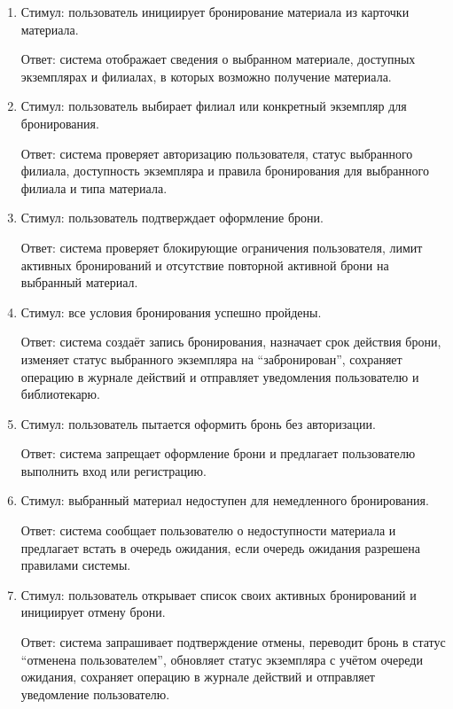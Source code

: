 \documentclass[12pt,a4paper]{article}
\begin{document}
	\begin{enumerate}
		\item Стимул: пользователь инициирует бронирование материала из карточки
		материала.
		
		Ответ: система отображает сведения о выбранном материале, доступных
		экземплярах и филиалах, в которых возможно получение материала.
		
		\item Стимул: пользователь выбирает филиал или конкретный экземпляр для
		бронирования.
		
		Ответ: система проверяет авторизацию пользователя, статус выбранного филиала,
		доступность экземпляра и правила бронирования для выбранного филиала и типа
		материала.
		
		\item Стимул: пользователь подтверждает оформление брони.
		
		Ответ: система проверяет блокирующие ограничения пользователя, лимит активных
		бронирований и отсутствие повторной активной брони на выбранный материал.
		
		\item Стимул: все условия бронирования успешно пройдены.
		
		Ответ: система создаёт запись бронирования, назначает срок действия брони,
		изменяет статус выбранного экземпляра на ``забронирован'', сохраняет операцию
		в журнале действий и отправляет уведомления пользователю и библиотекарю.
		
		\item Стимул: пользователь пытается оформить бронь без авторизации.
		
		Ответ: система запрещает оформление брони и предлагает пользователю выполнить
		вход или регистрацию.
		
		\item Стимул: выбранный материал недоступен для немедленного бронирования.
		
		Ответ: система сообщает пользователю о недоступности материала и предлагает
		встать в очередь ожидания, если очередь ожидания разрешена правилами системы.
		
		\item Стимул: пользователь открывает список своих активных бронирований и
		инициирует отмену брони.
		
		Ответ: система запрашивает подтверждение отмены, переводит бронь в статус
		``отменена пользователем'', обновляет статус экземпляра с учётом очереди
		ожидания, сохраняет операцию в журнале действий и отправляет уведомление
		пользователю.
		

\end{enumerate}
\end{document}
